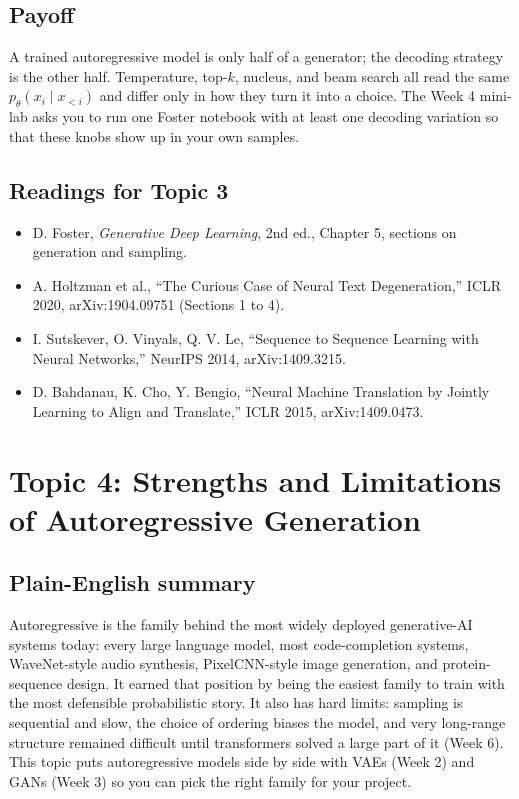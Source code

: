 \documentclass[11pt]{article}
\theoremstyle{remark}
\begin{document}
\subsection{Payoff}

A trained autoregressive model is only half of a generator; the decoding strategy is the other half. Temperature, top-$k$, nucleus, and beam search all read the same $p_\theta(x_i \mid x_{<i})$ and differ only in how they turn it into a choice. The Week 4 mini-lab asks you to run one Foster notebook with at least one decoding variation so that these knobs show up in your own samples.

\subsection*{Readings for Topic 3}
\begin{itemize}[nosep]\raggedright
\item D. Foster, \emph{Generative Deep Learning}, 2nd ed., Chapter 5, sections on generation and sampling.
\item A. Holtzman et al., ``The Curious Case of Neural Text Degeneration,'' ICLR 2020, arXiv:1904.09751 (Sections 1 to 4).
\item I. Sutskever, O. Vinyals, Q. V. Le, ``Sequence to Sequence Learning with Neural Networks,'' NeurIPS 2014, arXiv:1409.3215.
\item D. Bahdanau, K. Cho, Y. Bengio, ``Neural Machine Translation by Jointly Learning to Align and Translate,'' ICLR 2015, arXiv:1409.0473.
\end{itemize}

\clearpage
\section{Topic 4: Strengths and Limitations of Autoregressive Generation}

\subsection{Plain-English summary}

Autoregressive is the family behind the most widely deployed generative-AI systems today: every large language model, most code-completion systems, WaveNet-style audio synthesis, PixelCNN-style image generation, and protein-sequence design. It earned that position by being the easiest family to train with the most defensible probabilistic story. It also has hard limits: sampling is sequential and slow, the choice of ordering biases the model, and very long-range structure remained difficult until transformers solved a large part of it (Week 6). This topic puts autoregressive models side by side with VAEs (Week 2) and GANs (Week 3) so you can pick the right family for your project.
\end{document}
